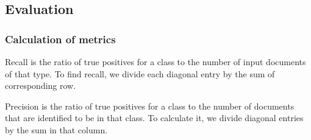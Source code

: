 \subsection{Evaluation}
\label{sec:bayes_evaluation}

\subsubsection{Calculation of metrics}
Recall is the ratio of true positives for a class to the number of input documents of that type. To find recall, we divide each diagonal entry by the sum of corresponding row.

Precision is the ratio of true positives for a class to the number of documents that are identified to be in that class. To calculate it, we divide diagonal entries by the sum in that column.
